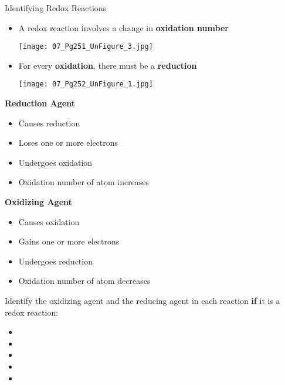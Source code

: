 \documentclass[handout]{beamer}
\begin{document}
\begin{frame}[allowframebreaks]{Identifying Redox Reactions}
	\begin{itemize}
		\item A redox reaction involves a change in \textbf{oxidation
			number}

			\begin{center}
				\texttt{[image: 07\_Pg251\_UnFigure\_3.jpg]}
			\end{center}
		\item For every \textbf{oxidation}, there must be a
			\textbf{reduction}

			\begin{center}
				\texttt{[image: 07\_Pg252\_UnFigure\_1.jpg]}
			\end{center}
	\end{itemize}

	\framebreak

	\textbf{\color{blue} Reduction Agent}
	\begin{itemize}
		\item Causes reduction
		\item Loses one or more electrons
		\item Undergoes oxidation
		\item Oxidation number of atom increases
	\end{itemize}

	\bigskip

	\textbf{\color{red} Oxidizing Agent}
	\begin{itemize}
		\item Causes oxidation
		\item Gains one or more electrons
		\item Undergoes reduction
		\item Oxidation number of atom decreases
	\end{itemize}

	\framebreak

	Identify the oxidizing agent and the reducing agent in each reaction
	\textbf{if} it is a redox reaction:

	\begin{itemize}
		\item {}
		\item {}
		\item {}
		\item {}
		\item {}
	\end{itemize}

\end{frame}
\end{document}
